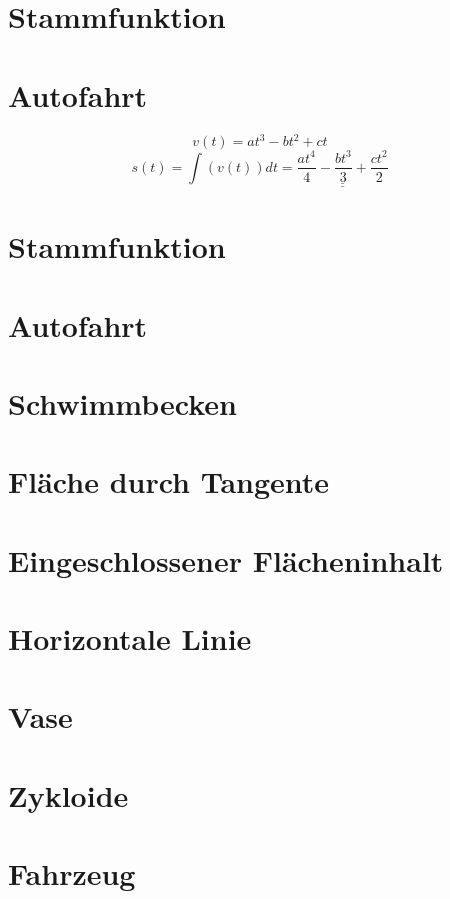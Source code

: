 \section{Stammfunktion}

\section{Autofahrt}
\[ v(t) = a t^3 - b t^2 + c t \]
\[ s(t) = \int (v(t)) dt = \underline{\underline{\frac{a t^4}{4} - \frac{b t^3}{3} + \frac{c t^2}{2}}} \]

\section{Stammfunktion}

\section{Autofahrt}

\section{Schwimmbecken}

\section{Fläche durch Tangente}

\section{Eingeschlossener Flächeninhalt}

\section{Horizontale Linie}

\section{Vase}

\section{Zykloide}

\section{Fahrzeug}
